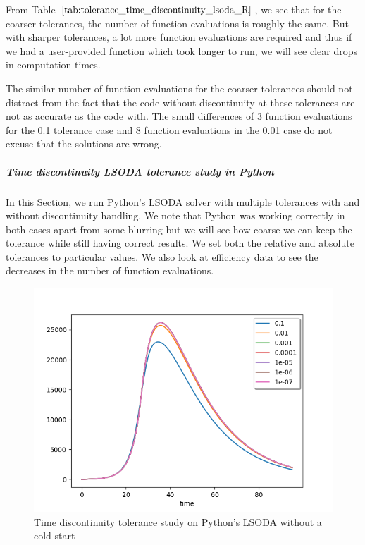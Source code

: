 From Table $\ref{tab:tolerance_time_discontinuity_lsoda_R}$, we see that for the coarser tolerances, the number of function evaluations is roughly the same. But with sharper tolerances, a lot more function evaluations are required and thus if we had a user-provided function which took longer to run, we will see clear drops in computation times.

The similar number of function evaluations for the coarser tolerances should not distract from the fact that the code without discontinuity at these tolerances are not as accurate as the code with. The small differences of 3 function evaluations for the 0.1 tolerance case and 8 function evaluations in the 0.01 case do not excuse that the solutions are wrong.

\subparagraph{Time discontinuity LSODA tolerance study in Python}
In this Section, we run Python's LSODA solver with multiple tolerances with and without discontinuity handling. We note that Python was working correctly in both cases apart from some blurring but we will see how coarse we can keep the tolerance while still having correct results. We set both the relative and absolute tolerances to particular values. We also look at efficiency data to see the decreases in the number of function evaluations.

\begin{figure}[h]
	\centering
	\includegraphics[width=0.7\linewidth]{./figures/tolerance_time_lsoda_no_event_py}
	\caption{Time discontinuity tolerance study on Python's LSODA without a cold start}
	\label{fig:tolerance_time_lsoda_no_event_py}
\end{figure}

